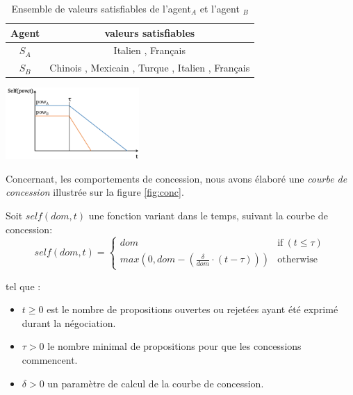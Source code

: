 	\begin{table}[h]
		\centering
		{\scriptsize
			\begin{tabular}{ |c|c| }
				\hline
				\textbf{Agent} & \textbf{valeurs satisfiables} \\
				\hline				
				$S_A$ & Italien , Français \\
				\hline
				
				$S_B$ & Chinois ,  Mexicain , Turque , Italien , Français\\
				\hline
				
			\end{tabular}}
			\caption{Ensemble de valeurs satisfiables de l'agent$_A$ et l'agent $_B$}
			\label{tab:exSat}
		\end{table}
			\begin{floatingfigure}[l]{2.1 in}
				\includegraphics[width=2in]{Figures/sv3.png}
				\caption{\label{fig:conc}Courbe de concession reprenant le principe 1}
			\end{floatingfigure} 
			
	
	
	Concernant, les comportements de concession, nous avons élaboré une \emph {courbe de concession} illustrée sur la figure \ref{fig:conc}. 
	

	Soit $ self (dom, t) $ une fonction variant dans le temps, suivant la courbe de concession:
	\begin{equation}
	self(dom, t) = \left\{\begin{array}{ll}
	dom & \mathrm{if\ } (t \leq \tau)\\
	max(0, dom - (\frac{\delta}{dom} \cdot (t - \tau))) & \mathrm{otherwise}
	\end{array}\right.
	\end{equation}
	
	
	
	tel que :
	\begin{itemize}
		\item $t \geq 0$ est le nombre de propositions ouvertes ou rejetées ayant été exprimé durant la négociation.
		\item $\tau > 0$ le nombre minimal de propositions pour que les concessions commencent.
		\item  $\delta > 0$ un paramètre de calcul de la courbe de concession.
		
	\end{itemize}  
	
